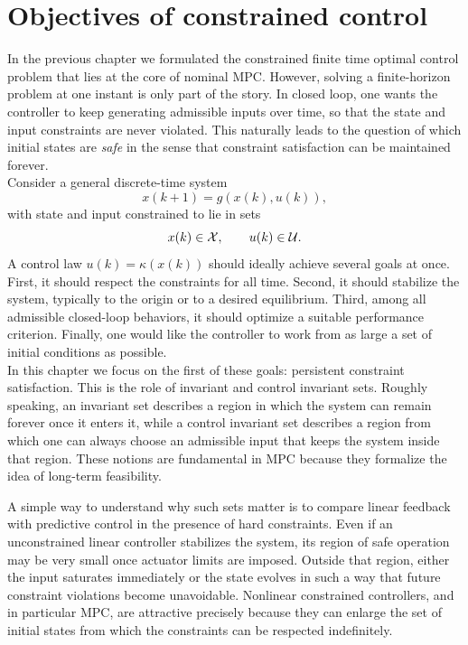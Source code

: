 \section{Objectives of constrained control}

In the previous chapter we formulated the constrained finite time optimal control problem that lies
at the core of nominal MPC. However, solving a finite-horizon problem at one instant is only part
of the story. In closed loop, one wants the controller to keep generating admissible inputs over time,
so that the state and input constraints are never violated. This naturally leads to the question of
which initial states are \emph{safe} in the sense that constraint satisfaction can be maintained forever.\\

Consider a general discrete-time system
\[
x(k+1)=g(x(k),u(k)),
\]
with state and input constrained to lie in sets
\[
x(k)\in \mathcal{X},\qquad u(k)\in \mathcal{U}.
\]
A control law \(u(k)=\kappa(x(k))\) should ideally achieve several goals at once. First, it should
respect the constraints for all time. Second, it should stabilize the system, typically to the origin
or to a desired equilibrium. Third, among all admissible closed-loop behaviors, it should optimize
a suitable performance criterion. Finally, one would like the controller to work from as large a set
of initial conditions as possible.\\

In this chapter we focus on the first of these goals: persistent constraint satisfaction. This is the
role of invariant and control invariant sets. Roughly speaking, an invariant set describes a region in
which the system can remain forever once it enters it, while a control invariant set describes a region
from which one can always choose an admissible input that keeps the system inside that region.
These notions are fundamental in MPC because they formalize the idea of long-term feasibility.

A simple way to understand why such sets matter is to compare linear feedback with predictive
control in the presence of hard constraints. Even if an unconstrained linear controller stabilizes the
system, its region of safe operation may be very small once actuator limits are imposed. Outside
that region, either the input saturates immediately or the state evolves in such a way that future
constraint violations become unavoidable. Nonlinear constrained controllers, and in particular MPC,
are attractive precisely because they can enlarge the set of initial states from which the constraints
can be respected indefinitely.

